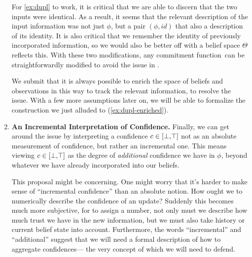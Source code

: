 \begin{subappendices}
\begin{enumerate}[label={\textbf{I\arabic*.}},ref={I\arabic*}]
    	For \cref{ex:dupl} to work, it is critical that we are able to discern that the two inputs were identical.
    	As a result, it seems that the relevant description of the input information was not just $\phi$, but a pair $(\phi, \mathit{id})$ that also a description of its identity.
    	It is also critical that we remember the identity of previously incorporated information, so we would also be better off with a belief space $\Theta$ reflects this.
    	With these two modifications, any commitment function\ can be straightforwardly modified to avoid the issue in .


    	We submit that it is always possible to enrich the space of beliefs and observations in this way to track the relevant information, to resolve the issue.
    	With a few more assumptions later on, we will be able to formalize the construction we just alluded to (\cref{ex:dupl-enriched}).

    	\item \textbf{An Incremental Interpretation of Confidence.}
    		\label{approach:interperet}
    	Finally, we can get around the issue by interpreting a confidence $c \in [\bot,\!\top]$ not as an absolute measurement of confidence, but rather an incremental one.  This means viewing $c \in [\bot,\!\top]$ as the degree of \emph{additional} confidence we have in $\phi$, beyond whatever we have already incorporated into our beliefs.

    	This proposal might be concerning.
    	One might worry that it's harder to make sense of ``incremental confidence'' than an absolute notion.
    	How ought we to numerically describe the confidence of an update?
    	Suddenly this becomes much more subjective, for to assign a number, not only must we describe how much trust we have in the new information, but we must also take history or current belief state into account.
    	Furthermore, the words ``incremental'' and ``additional'' suggest that we will need a formal description of how to aggregate confidences---%
    	the very concept of which we will need to defend.


\end{enumerate}
\end{subappendices}
